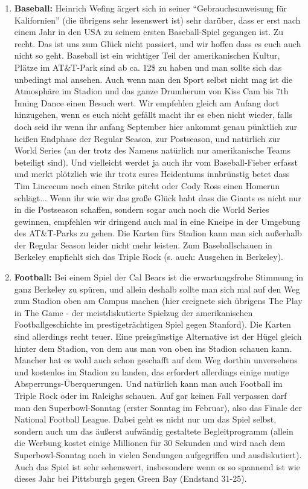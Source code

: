 \documentclass[a4paper]{scrreprt}
\begin{document}
\begin{enumerate}

	\item \textbf{Baseball:} Heinrich Wefing ärgert sich in seiner "`Gebrauchsanweisung für Kalifornien"' (die übrigens sehr lesenswert ist) sehr darüber, dass er erst nach einem Jahr in den USA zu seinem ersten Baseball-Spiel gegangen ist. Zu recht. Das ist uns zum Glück nicht passiert, und wir hoffen dass es euch auch nicht so geht. Baseball ist ein wichtiger Teil der amerikanischen Kultur, Plätze im AT\&T-Park sind ab ca. 12\$ zu haben und man sollte sich das unbedingt mal ansehen. Auch wenn man den Sport selbst nicht mag ist die Atmosphäre im Stadion und das ganze Drumherum von Kiss Cam bis 7th Inning Dance einen Besuch wert. Wir empfehlen gleich am Anfang dort hinzugehen, wenn es euch nicht gefällt macht ihr es eben nicht wieder, falls doch seid ihr wenn ihr anfang September hier ankommt genau pünktlich zur heißen Endphase der Regular Season, zur Postseason, und natürlich zur World Series (an der trotz des Namens natürlich nur amerikanische Teams beteiligt sind). Und vielleicht werdet ja auch ihr vom Baseball-Fieber erfasst und merkt plötzlich wie ihr trotz eures Heidentums innbrünstig betet dass Tim Lincecum noch einen Strike pitcht oder Cody Ross einen Homerun schlägt... Wenn ihr wie wir das große Glück habt dass die Giants es nicht nur in die Postseason schaffen, sondern sogar auch noch die World Series gewinnen, empfehlen wir dringend auch mal in eine Kneipe in der Umgebung des AT\&T-Parks zu gehen. Die Karten fürs Stadion kann man sich außerhalb der Regular Season leider nicht mehr leisten. Zum Baseballschauen in Berkeley empfiehlt sich das Triple Rock (s. auch: Ausgehen in Berkeley).

	\item \textbf{Football:} Bei einem Spiel der Cal Bears ist die erwartungsfrohe Stimmung in ganz Berkeley zu spüren, und allein deshalb sollte man sich mal auf den Weg zum Stadion oben am Campus machen (hier ereignete sich übrigens The Play in The Game - der meistdiskutierte Spielzug der amerikanischen Footballgeschichte im prestigeträchtigen Spiel gegen Stanford). Die Karten sind allerdings recht teuer. Eine preisgünstige Alternative ist der Hügel gleich hinter dem Stadion, von dem aus man von oben ins Stadion schauen kann. Mancher hat es wohl auch schon geschafft auf dem Weg dorthin unversehens und kostenlos im Stadion zu landen, das erfordert allerdings einige mutige Absperrungs-Überquerungen. Und natürlich kann man auch Football im Triple Rock oder im Raleighs schauen. Auf gar keinen Fall verpassen darf man den Superbowl-Sonntag (erster Sonntag im Februar), also das Finale der National Football League. Dabei geht es nicht nur um das Spiel selbst, sondern auch um das äußerst aufwändig gestaltete Begleitprogramm (allein die Werbung kostet einige Millionen für 30 Sekunden und wird nach dem Superbowl-Sonntag noch in vielen Sendungen aufgegriffen und ausdiskutiert). Auch das Spiel ist sehr sehenswert, insbesondere wenn es so spannend ist wie dieses Jahr bei Pittsburgh gegen Green Bay (Endstand 31-25).
	

\end{enumerate}
\end{document}
